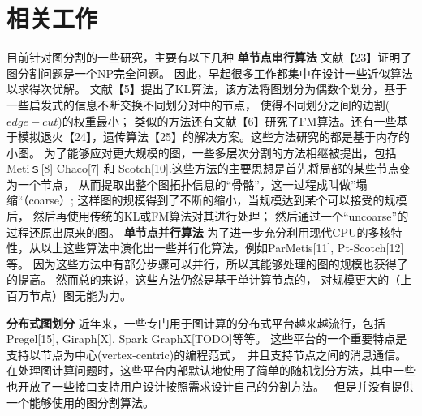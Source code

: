 \documentclass[master]{njuthesis}
\begin{document}
\section{相关工作}
目前针对图分割的一些研究，主要有以下几种
\textbf{单节点串行算法} 文献【23】证明了图分割问题是一个NP完全问题。 因此，早起很多工作都集中在设计一些近似算法以求得次优解。
文献【5】提出了KL算法，该方法将图划分为偶数个划分，基于一些启发式的信息不断交换不同划分对中的节点， 使得不同划分之间的边割($edge-cut$)的权重最小；
类似的方法还有文献【6】研究了FM算法。还有一些基于模拟退火【24】，遗传算法【25】的解决方案。这些方法研究的都是基于内存的小图。
为了能够应对更大规模的图，一些多层次分割的方法相继被提出，包括 Metiｓ[8] Chaco[7]  和 Scotch[10].这些方法的主要思想是首先将局部的某些节点变为一个节点，
从而提取出整个图拓扑信息的“骨骼”，这一过程成叫做”塌缩“（coarse）; 这样图的规模得到了不断的缩小，当规模达到某个可以接受的规模后， 然后再使用传统的KL或FM算法对其进行处理；
然后通过一个“uncoarse”的过程还原出原来的图。
\textbf{单节点并行算法} 为了进一步充分利用现代CPU的多核特性，从以上这些算法中演化出一些并行化算法，例如ParMetis[11], Pt-Scotch[12]等。 
因为这些方法中有部分步骤可以并行，所以其能够处理的图的规模也获得了的提高。 然而总的来说，这些方法仍然是基于单计算节点的， 对规模更大的（上百万节点）图无能为力。

\textbf{分布式图划分} 近年来，一些专门用于图计算的分布式平台越来越流行，包括Pregel[15], Giraph[X], Spark GraphX[TODO]等等。
这些平台的一个重要特点是支持以节点为中心(vertex-centric)的编程范式，　并且支持节点之间的消息通信。　
在处理图计算问题时，这些平台内部默认地使用了简单的随机划分方法，其中一些也开放了一些接口支持用户设计按照需求设计自己的分割方法。　
但是并没有提供一个能够使用的图分割算法。
\end{document}
